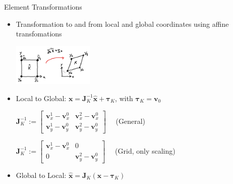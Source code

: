 \documentclass[handout,xcolor=pdftex,table,10pt,yellow,mathserif]{beamer}
\begin{document}
\begin{frame}{Element Transformations}

    \begin{itemize}
        \item Transformation to and from local and global coordinates using affine transfomations
            \begin{center}
            \includegraphics[height=2cm]{figures/affine_transformation_me.png}
            \end{center}

            \pause

        \item Local to Global: $\boldsymbol{x} = \mathbf{J}_K^{-1}\hat{\boldsymbol{x}} + \boldsymbol{\tau}_K$,\pause
            with $\boldsymbol{\tau}_K = \boldsymbol{v}_0$

            \vspace*{0.25cm}\pause
            $\displaystyle
                \mathbf{J}^{-1}_K := \begin{bmatrix}
                    \boldsymbol{v}_x^1 - \boldsymbol{v}_x^0 & \boldsymbol{v}_x^2 - \boldsymbol{v}_x^0\\
                    \boldsymbol{v}_y^1 - \boldsymbol{v}_y^0 & \boldsymbol{v}_y^2 - \boldsymbol{v}_y^0
                \end{bmatrix} \quad
            $ (General)\vspace*{0.25cm}
            \pause

            $\displaystyle
                \mathbf{J}^{-1}_K := \begin{bmatrix}
                    \boldsymbol{v}_x^1 - \boldsymbol{v}_x^0 & 0\\
                    0 & \boldsymbol{v}_y^2 - \boldsymbol{v}_y^0
                \end{bmatrix} \quad
            $ (Grid, only scaling)
            \vspace*{0.25cm}
        
        \pause
        
        \item Global to Local: $\hat{\boldsymbol{x}} = \mathbf{J}_K(\boldsymbol{x} - \boldsymbol{\tau}_K)$
    \end{itemize}
\end{frame}
\end{document}
